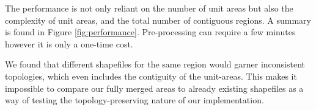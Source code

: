 The performance is not only reliant on the number of unit areas but also the complexity of unit areas, and the total number of contiguous regions. A summary is found in Figure \ref{fig:performance}. Pre-processing can require a few minutes however it is only a one-time cost.
 
We found that different shapefiles for the same region would garner inconsistent topologies, which even includes the contiguity of the unit-areas. This makes it impossible to compare our fully merged areas to already existing shapefiles as a way of testing the topology-preserving nature of our implementation. 




